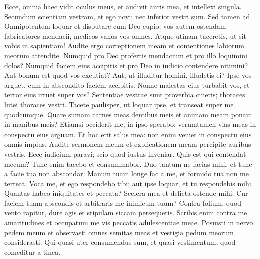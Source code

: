 \begin{biblechapter}
\begin{biblechapter}
\begin{biblechapter}
\begin{biblechapter}
\begin{biblechapter}
\begin{biblechapter}
\begin{biblechapter}
\begin{biblechapter}
\begin{biblechapter}
\begin{biblechapter}
\begin{biblechapter}
\begin{biblechapter}
\begin{biblechapter}
\verse Ecce, omnia haec vidit oculus meus,
 et audivit auris mea, et intellexi singula.
 \verse Secundum scientiam vestram, et ego novi;
 nec inferior vestri sum.
 \verse Sed tamen ad Omnipotentem loquar
 et disputare cum Deo cupio;
 \verse vos autem ostendam fabricatores mendacii,
 medicos vanos vos omnes.
 \verse Atque utinam taceretis,
 ut sit vobis in sapientiam!
 \verse Audite ergo correptionem meam
 et contentiones labiorum meorum attendite.
 \verse Numquid pro Deo profertis mendacium
 et pro illo loquimini dolos?
 \verse Numquid faciem eius accipitis
 et pro Deo in iudicio contendere nitimini?
 \verse Aut bonum est quod vos excutiat?
 Aut, ut illuditur homini, illudetis ei?
 \verse Ipse vos arguet,
 cum in abscondito faciem accipitis. 
\verse Nonne maiestas eius turbabit vos,
 et terror eius irruet super vos?
 \verse Sententiae vestrae sunt proverbia cineris;
 thoraces lutei thoraces vestri.
 \verse Tacete paulisper, ut loquar ipse,
 et transeat super me quodcumque.
 \verse Quare sumam carnes meas dentibus meis
 et animam meam ponam in manibus meis?
 \verse Etiamsi occiderit me, in ipso sperabo; verumtamen vias meas in conspectu eius arguam.
 \verse Et hoc erit salus mea:
 non enim veniet in conspectu eius omnis impius.
 \verse Audite sermonem meum
 et explicationem meam percipite auribus vestris.
 \verse Ecce iudicium paravi;
 scio quod iustus inveniar.
 \verse Quis est qui contendat mecum?
 Tunc enim tacebo et consummabor.
 \verse Duo tantum ne facias mihi,
 et tunc a facie tua non abscondar: 
\verse Manum tuam longe fac a me,
 et formido tua non me terreat.
 \verse Voca me, et ego respondebo tibi;
 aut ipse loquar, et tu respondebis mihi.
 \verse Quantas habeo iniquitates et peccata?
 Scelera mea et delicta ostende mihi. 
\verse Cur faciem tuam abscondis
 et arbitraris me inimicum tuum?
 \verse Contra folium, quod vento rapitur, dure agis
 et stipulam siccam persequeris.
 \verse Scribis enim contra me amaritudines
 et occupatum me vis peccatis adulescentiae meae.
 \verse Posuisti in nervo pedem meum
 et observasti omnes semitas meas
 et vestigia pedum meorum considerasti.
 \verse Qui quasi uter consumendus sum,
 et quasi vestimentum, quod comeditur a tinea.
 

\end{biblechapter}
\end{biblechapter}
\end{biblechapter}
\end{biblechapter}
\end{biblechapter}
\end{biblechapter}
\end{biblechapter}
\end{biblechapter}
\end{biblechapter}
\end{biblechapter}
\end{biblechapter}
\end{biblechapter}
\end{biblechapter}

